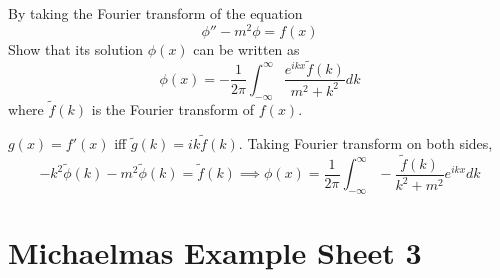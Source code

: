 \documentclass[a4paper]{article}
\begin{document}
\begin{qns}
By taking the Fourier transform of the equation
$$\phi''-m^2\phi=f(x)$$
Show that its solution $\phi(x)$ can be written as
$$\phi(x)=-\frac{1}{2\pi}\int_{-\infty}^\infty\frac{e^{ikx}\tilde{f}(k)}{m^2+k^2}dk$$
where $\tilde{f}(k)$ is the Fourier transform of $f(x)$.
\end{qns}
\begin{ans}
$g(x)=f'(x)$ iff $\tilde{g}(k)=ik\tilde{f}(k)$. Taking Fourier transform on both sides,
$$-k^2\tilde{\phi}(k)-m^2\tilde{\phi}(k)=\tilde{f}(k)\implies\phi(x)=\frac{1}{2\pi}\int_{-\infty}^\infty -\frac{\tilde{f}(k)}{k^2+m^2}e^{ikx}dk$$
\end{ans}
\newpage
\section{Michaelmas Example Sheet 3}
\end{document}
